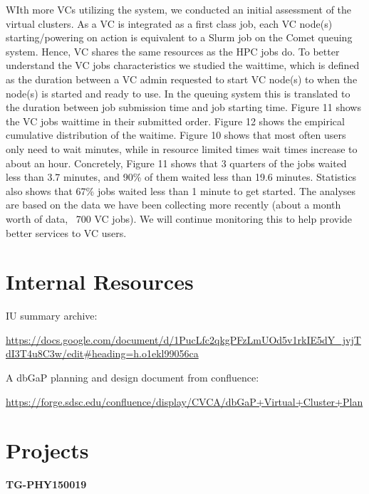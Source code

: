 WIth more VCs utilizing the system, we conducted an initial assessment of the virtual clusters. As a VC is integrated as a first class job, each VC node(s) starting/powering on action is equivalent to a Slurm job on the Comet queuing system. Hence, VC shares the same resources as the HPC jobs do. To better understand the VC jobs characteristics we studied the waittime, which is defined as the duration between a VC admin requested to start VC node(s) to when the node(s) is started and ready to use. In the queuing system this is translated to the duration between job submission time and job starting time. Figure 11 shows the VC jobs waittime in their submitted order. Figure 12 shows the empirical cumulative distribution of the waitime. Figure 10 shows that most often users only need to wait minutes, while in resource limited times wait times increase to about an hour. Concretely, Figure 11 shows that 3 quarters of the jobs waited less than 3.7 minutes, and 90\% of them waited less than 19.6 minutes. Statistics also shows that 67\% jobs waited less than 1 minute to get started. The analyses are based on the data we have been collecting more recently (about a month worth of data, ~700 VC jobs). We will continue monitoring this to help provide better services to VC users.




\appendix

\section{Internal Resources}

IU summary archive:

\url{https://docs.google.com/document/d/1PucLfc2qkgPFzLmUOd5v1rkIE5dY_jvjTdI3T4u8C3w/edit#heading=h.o1ekl99056ca}

A dbGaP planning and design document from confluence:

\url{https://forge.sdsc.edu/confluence/display/CVCA/dbGaP+Virtual+Cluster+Plan}

\section{Projects}

\textbf{TG-PHY150019}

